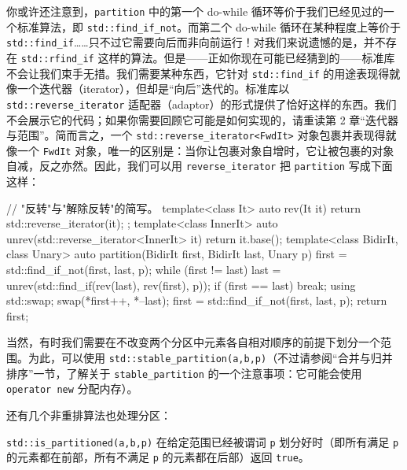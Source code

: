 你或许还注意到，\texttt{partition} 中的第一个 do-while 循环等价于我们已经见过的一个标准算法，即 \texttt{std::\allowbreak{}find\_\allowbreak{}if\_\allowbreak{}not}。而第二个 do-while 循环在某种程度上等价于 \texttt{std::\allowbreak{}find\_\allowbreak{}if}……只不过它需要向后而非向前运行！对我们来说遗憾的是，并不存在 \texttt{std::\allowbreak{}rfind\_\allowbreak{}if} 这样的算法。但是——正如你现在可能已经猜到的——标准库不会让我们束手无措。我们需要某种东西，它针对 \texttt{std::\allowbreak{}find\_\allowbreak{}if} 的用途表现得就像一个迭代器（iterator），但却是“向后”迭代的。标准库以 \texttt{std::\allowbreak{}reverse\_\allowbreak{}iterator} 适配器（adaptor）的形式提供了恰好这样的东西。我们不会展示它的代码；如果你需要回顾它可能是如何实现的，请重读第 2 章“迭代器与范围”。简而言之，一个 \texttt{std::\allowbreak{}reverse\_\allowbreak{}iterator<\allowbreak{}Fwd\allowbreak{}It>\allowbreak{}} 对象包裹并表现得就像一个 \texttt{Fwd\allowbreak{}It} 对象，唯一的区别是：当你让包裹对象自增时，它让被包裹的对象自减，反之亦然。因此，我们可以用 \texttt{reverse\_\allowbreak{}iterator} 把 \texttt{partition} 写成下面这样：

\begin{codebox}[cpp]
     // "反转"与"解除反转"的简写。
     template<class It>
     auto rev(It it) {
       return std::reverse_iterator(it);
     };
     template<class InnerIt>
     auto unrev(std::reverse_iterator<InnerIt> it) {
       return it.base();
     }
     template<class BidirIt, class Unary>
     auto partition(BidirIt first, BidirIt last, Unary p)
     {
       first = std::find_if_not(first, last, p);
       while (first != last) {
         last = unrev(std::find_if(rev(last), rev(first), p));
         if (first == last) break;
         using std::swap;
         swap(*first++, *--last);
         first = std::find_if_not(first, last, p);
       }
       return first;
     }
\end{codebox}

当然，有时我们需要在不改变两个分区中元素各自相对顺序的前提下划分一个范围。为此，可以使用 \texttt{std::\allowbreak{}stable\_\allowbreak{}partition(\allowbreak{}a,\allowbreak{}b,\allowbreak{}p)\allowbreak{}}（不过请参阅“合并与归并排序”一节，了解关于 \texttt{stable\_\allowbreak{}partition} 的一个注意事项：它可能会使用 \texttt{operator new} 分配内存）。

还有几个非重排算法也处理分区：

\texttt{std::\allowbreak{}is\_\allowbreak{}partitioned(\allowbreak{}a,\allowbreak{}b,\allowbreak{}p)\allowbreak{}} 在给定范围已经被谓词 \texttt{p} 划分好时（即所有满足 \texttt{p} 的元素都在前部，所有不满足 \texttt{p} 的元素都在后部）返回 \texttt{true}。

